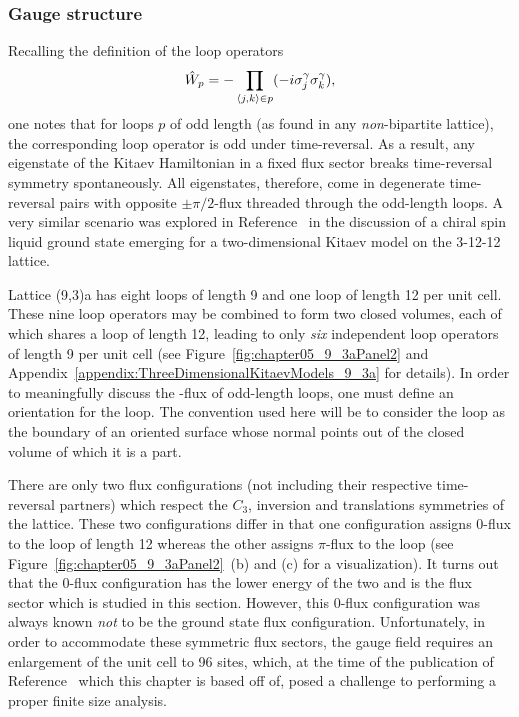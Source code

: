 %
%
\subsubsection{Gauge structure}
%
%
Recalling the definition of the loop operators
%
\begin{equation}
\hat{W}_p = -\prod_{\langle j,k \rangle \in p} (-i \sigma^{\gamma}_j \sigma^{\gamma}_k),
\end{equation}
%
one notes that for loops $p$ of odd length (as found in any \textit{non}-bipartite lattice), the corresponding loop operator is odd under time-reversal.
As a result, any eigenstate of the Kitaev Hamiltonian in a fixed flux sector breaks time-reversal symmetry spontaneously.
All eigenstates, therefore, come in degenerate time-reversal pairs with opposite $\pm \pi/2$-flux threaded through the odd-length loops.
A very similar scenario was explored in Reference~\cite{YaoPRL2007} in the discussion of a chiral spin liquid ground state emerging for a two-dimensional Kitaev model on the 3-12-12 lattice.

Lattice (9,3)a has eight loops of length 9 and one loop of length 12 per unit cell.
These nine loop operators may be combined to form two closed volumes, each of which shares a loop of length 12, leading to only \textit{six} independent loop operators of length 9 per unit cell (see Figure~\ref{fig:chapter05_9_3aPanel2} and Appendix~\ref{appendix:ThreeDimensionalKitaevModels_9_3a} for details).
In order to meaningfully discuss the \ZZ-flux of odd-length loops, one must define an orientation for the loop.
The convention used here will be to consider the loop as the boundary of an oriented surface whose normal points out of the closed volume of which it is a part.

There are only two flux configurations (not including their respective time-reversal partners) which respect the $C_3$, inversion and translations symmetries of the lattice.
These two configurations differ in that one configuration assigns $0$-flux to the loop of length 12 whereas the other assigns $\pi$-flux to the loop (see Figure~\ref{fig:chapter05_9_3aPanel2}~(b) and (c) for a visualization).
It turns out that the $0$-flux configuration has the lower energy of the two and is the flux sector which is studied in this section.
However, this $0$-flux configuration was always known \textit{not} to be the ground state flux configuration.
Unfortunately, in order to accommodate these symmetric flux sectors, the gauge field requires an enlargement of the unit cell to 96 sites, which, at the time of the publication of Reference~\cite{OBrienPRB2016} which this chapter is based off of, posed a challenge to performing a proper finite size analysis.

